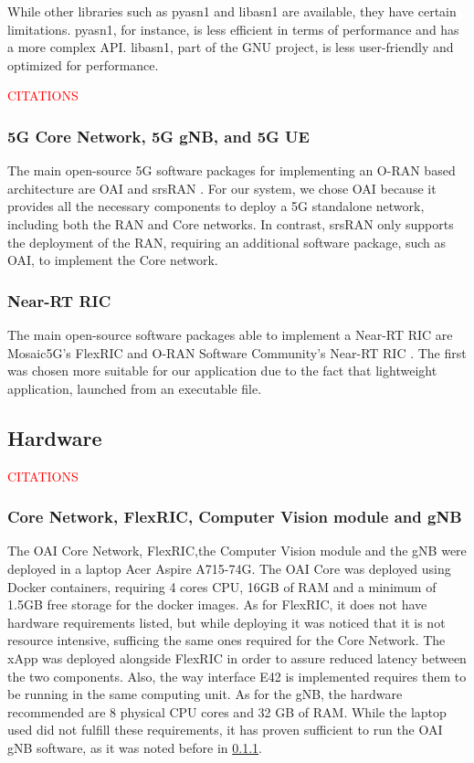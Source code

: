 While other libraries such as pyasn1 and libasn1 are available, they have certain limitations.
pyasn1, for instance, is less efficient in terms of performance and has a more complex API\@.
libasn1, part of the GNU project, is less user-friendly and optimized for performance.

\textcolor{red}{CITATIONS}
\subsubsection{5G Core Network, 5G gNB, and 5G UE}
The main open-source 5G software packages for implementing an O-RAN based architecture are OAI \cite[]{} and srsRAN \cite[]{}.
For our system, we chose OAI because it provides all the necessary components to deploy a 5G standalone network, including both the RAN and Core networks.
In contrast, srsRAN only supports the deployment of the RAN, requiring an additional software package, such as OAI, to implement the Core network.

\subsubsection{Near-RT RIC}
The main open-source software packages able to implement a Near-RT RIC are Mosaic5G’s FlexRIC \cite[]{} and  O-RAN Software Community’s Near-RT RIC \cite[]{}.
The first was chosen more suitable for our application due to the fact that lightweight application, launched from an executable file.

\subsection{Hardware}\label{subsec:hardware}

\textcolor{red}{CITATIONS}
\subsubsection{Core Network, FlexRIC, Computer Vision module and gNB}
The OAI Core Network, FlexRIC,the Computer Vision module and the gNB were deployed in a laptop Acer Aspire A715-74G\@.
The OAI Core was deployed using Docker containers, requiring 4 cores CPU, 16GB of RAM and a minimum of 1.5GB free storage for the docker images.
As for FlexRIC, it does not have hardware requirements listed, but while deploying it was noticed that it is not resource intensive, sufficing the same ones required for the Core Network.
The xApp was deployed alongside FlexRIC in order to assure reduced latency between the two components.
Also,  the way interface E42 is implemented requires them to be running in the same computing unit.
As for the gNB, the hardware recommended are 8 physical CPU cores and 32 GB of RAM\@.
While the laptop used did not fulfill these requirements, it has proven sufficient to run the OAI gNB software, as it was noted before in \ref{}. %

